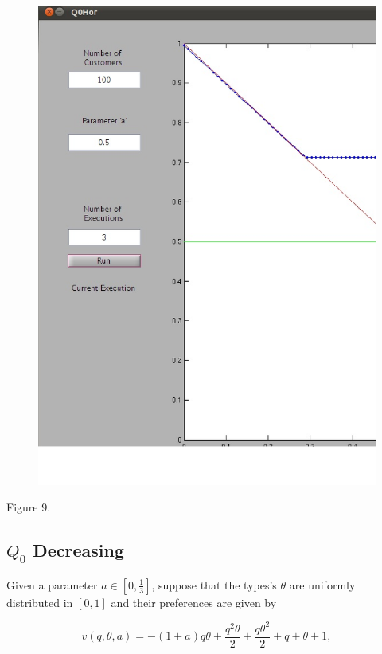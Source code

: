 \begin{itemize}
\begin{center}
\begin{figure}[h!]
\includegraphics[scale=0.2]{hor_q1dec_inv.eps} 
\end{figure}
Figure 9.
\end{center}
\end{itemize}

\newpage

\subsection{$Q_{0}$ Decreasing}

Given a parameter $a\in[0,\frac{1}{3}]$, suppose that the types's $\theta$ are uniformly distributed in $[0,1]$ and their preferences  are given by

 $$v(q,\theta,a)= -(1 + a) q \theta + \frac{q^2 \theta}{2} + \frac{q \theta^{2}}{2} + q + \theta + 1,$$

